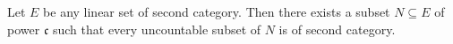 Let $E$ be any linear set of second category. Then there exists a subset $N \subseteq E$ of power $\mathfrak{c}$ such that every uncountable subset of $N$ is of second category.

